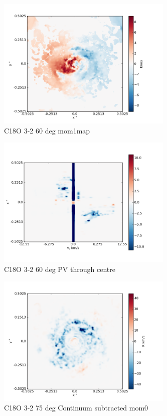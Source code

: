 \documentclass[useAMS,usenatbib]{mn2e}
\begin{document}
\begin{figure}
 \includegraphics[width=84mm]{Figures/sim/imageC18O_3-2_60deg_mom1.png}

 \caption{C18O 3-2 60 deg mom1map}
\end{figure}

\begin{figure}
 \includegraphics[width=84mm]{Figures/sim/imageC18O_3-2_60deg_PV_centre.png}

 \caption{C18O 3-2 60 deg PV through centre}
\end{figure}

\begin{figure}
 \includegraphics[width=84mm]{Figures/sim/imageC18O_3-2_75deg_contSub.png}

 \caption{C18O 3-2 75 deg Continuum subtracted mom0}
\end{figure}
\end{document}
